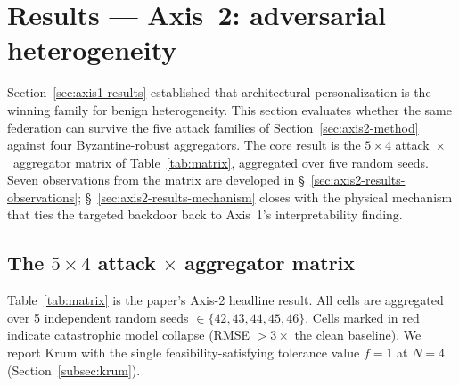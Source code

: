 \documentclass[a4paper,fleqn,doubleblind]{cas-sc}
\begin{document}


\section{Results --- Axis~2: adversarial heterogeneity}
\label{sec:axis2-results}

Section~\ref{sec:axis1-results} established that architectural
personalization is the winning family for benign heterogeneity. This
section evaluates whether the same federation can survive the five
attack families of Section~\ref{sec:axis2-method} against four
Byzantine-robust aggregators. The core result is the $5 \times 4$
attack~$\times$~aggregator matrix of Table~\ref{tab:matrix},
aggregated over five random seeds. Seven observations from the matrix
are developed in \S~\ref{sec:axis2-results-observations};
\S~\ref{sec:axis2-results-mechanism} closes with the physical
mechanism that ties the targeted backdoor back to Axis~1's
interpretability finding.

\subsection{The $5 \times 4$ attack $\times$ aggregator matrix}
\label{sec:axis2-results-matrix}

Table~\ref{tab:matrix} is the paper's Axis-2 headline result. All
cells are aggregated over 5 independent random seeds
$\in \{42, 43, 44, 45, 46\}$. Cells marked in red indicate
catastrophic model collapse (RMSE $> 3\times$ the clean baseline).
We report Krum with the single feasibility-satisfying tolerance
value $f = 1$ at $N = 4$ (Section~\ref{subsec:krum}).
\end{document}

